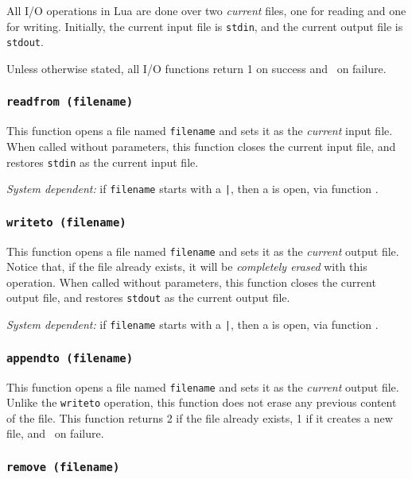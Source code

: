 All I/O operations in Lua are done over two {\em current} files,
one for reading and one for writing.
Initially, the current input file is \verb'stdin',
and the current output file is \verb'stdout'.

Unless otherwise stated,
all I/O functions return 1 on success and \nil\ on failure.

\subsubsection*{{\tt readfrom (filename)}}

This function opens a file named \verb'filename' and sets it as the
{\em current} input file.
When called without parameters,
this function closes the current input file,
and restores \verb'stdin' as the current input file.

{\em System dependent:} if \verb'filename' starts with a \verb'|',
then a  is open, via function .

\subsubsection*{{\tt writeto (filename)}}

This function opens a file named \verb'filename' and sets it as the
{\em current} output file.
Notice that, if the file already exists,
it will be {\em completely erased} with this operation.
When called without parameters,
this function closes the current output file,
and restores \verb'stdout' as the current output file.

{\em System dependent:} if \verb'filename' starts with a \verb'|',
then a  is open, via function .

\subsubsection*{{\tt appendto (filename)}}

This function opens a file named \verb'filename' and sets it as the
{\em current} output file.
Unlike the \verb'writeto' operation,
this function does not erase any previous content of the file.
This function returns 2 if the file already exists,
1 if it creates a new file, and \nil\ on failure.

\subsubsection*{{\tt remove (filename)}}

